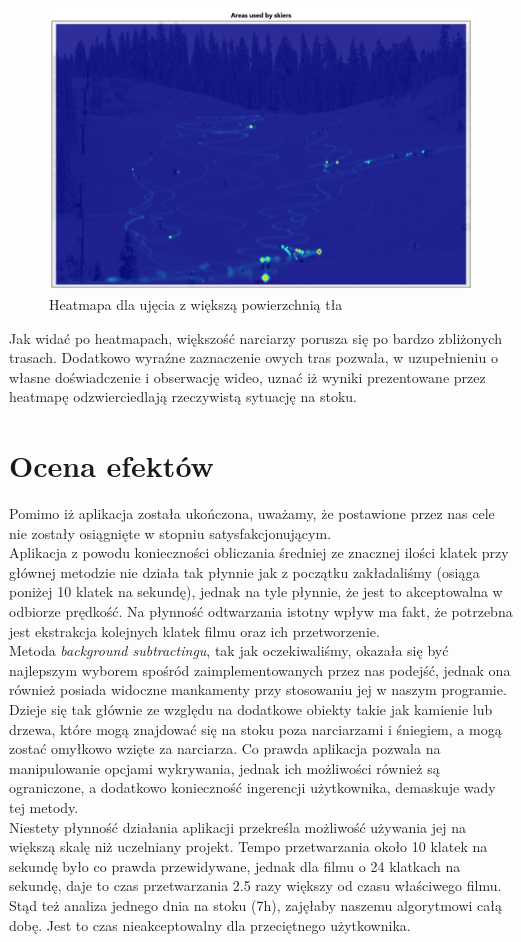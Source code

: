 \documentclass[a4paper]{article}
\begin{document}
\begin{figure}[H]
  \includegraphics[width=\linewidth]{resources/img13.png}
  \caption{Heatmapa dla ujęcia z większą powierzchnią tła}
\end{figure}

Jak widać po heatmapach, większość narciarzy porusza się po bardzo zbliżonych trasach. Dodatkowo wyraźne zaznaczenie owych tras pozwala, w uzupełnieniu o własne doświadczenie i obserwację wideo, uznać iż wyniki prezentowane przez heatmapę odzwierciedlają rzeczywistą sytuację na stoku.

\section{Ocena efektów}
Pomimo iż aplikacja została ukończona, uważamy, że postawione przez nas cele nie zostały osiągnięte w stopniu satysfakcjonującym.\\
Aplikacja z powodu konieczności obliczania średniej ze znacznej ilości klatek  przy głównej metodzie nie działa tak płynnie jak z początku zakładaliśmy (osiąga poniżej 10 klatek na sekundę), jednak na tyle płynnie, że jest to akceptowalna w odbiorze prędkość. Na płynność odtwarzania istotny wpływ ma fakt, że potrzebna jest ekstrakcja kolejnych klatek filmu oraz ich przetworzenie.\\
Metoda \textit{background subtractingu}, tak jak oczekiwaliśmy, okazała się  być najlepszym wyborem spośród zaimplementowanych przez nas podejść, jednak ona również posiada widoczne mankamenty przy stosowaniu jej w naszym programie. Dzieje się tak głównie ze względu na dodatkowe obiekty takie jak kamienie lub drzewa, które mogą znajdować się na stoku poza narciarzami i śniegiem, a mogą zostać omyłkowo wzięte za narciarza. Co prawda aplikacja pozwala na manipulowanie opcjami wykrywania, jednak ich możliwości również są ograniczone, a dodatkowo konieczność ingerencji użytkownika, demaskuje wady tej metody.\\
Niestety płynność działania aplikacji przekreśla możliwość używania jej na większą skalę niż uczelniany projekt. Tempo przetwarzania około 10 klatek na sekundę było co prawda przewidywane, jednak dla filmu o 24 klatkach na sekundę, daje to czas przetwarzania 2.5 razy większy od czasu właściwego filmu. Stąd też analiza jednego dnia na stoku (7h), zajęłaby naszemu algorytmowi całą dobę. Jest to czas nieakceptowalny dla przeciętnego użytkownika.
\end{document}

